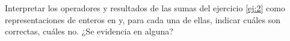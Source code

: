 \begin{enunciado}{\ejercicio}
  Interpretar los operadores y resultados de las sumas del ejercicio \ref{ej:2} como representaciones de enteros
  en \compDos y, para cada una de ellas, indicar cuáles son correctas, cuáles no. ¿Se evidencia \overflow en alguna?
\end{enunciado}
